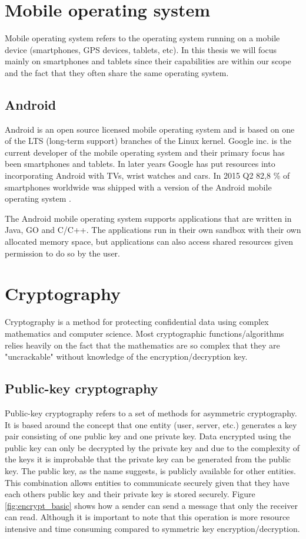 \section{Mobile operating system}
Mobile operating system refers to the operating system running on a mobile device (smartphones, GPS devices, tablets, etc). In this thesis we will focus mainly on smartphones and tablets since their capabilities are within our scope and the fact that they often share the same operating system.

\subsection{Android}
Android is an open source licensed mobile operating system and is based on one of the LTS (long-term support) branches of the Linux kernel. Google inc. \cite{google} is the current developer of the mobile operating system and their primary focus has been smartphones and tablets. In later years Google has put resources into incorporating Android with TVs, wrist watches and cars. In 2015 Q2 82,8 \% of smartphones worldwide was shipped with a version of the Android mobile operating system \cite{androidMarketShare}.

The Android mobile operating system supports applications that are written in Java, GO and C/C++. The applications run in their own sandbox with their own allocated memory space, but applications can also access shared resources given permission to do so by the user.

\section{Cryptography}
Cryptography is a method for protecting confidential data using complex mathematics and computer science. Most cryptographic functions/algorithms relies heavily on the fact that the mathematics are so complex that they are "uncrackable" without knowledge of the encryption/decryption key.

\subsection{Public-key cryptography}
Public-key cryptography refers to a set of methods for asymmetric cryptography. It is based around the concept that one entity (user, server, etc.) generates a key pair consisting of one public key and one private key. Data encrypted using the public key can only be decrypted by the private key and due to the complexity of the keys it is improbable that the private key can be generated from the public key. The public key, as the name suggests, is publicly available for other entities. This combination allows entities to communicate securely given that they have each others public key and their private key is stored securely. Figure \ref{fig:encrypt_basic} shows how a sender can send a message that only the receiver can read. Although it is important to note that this operation is more resource intensive and time consuming compared to symmetric key encryption/decryption.

